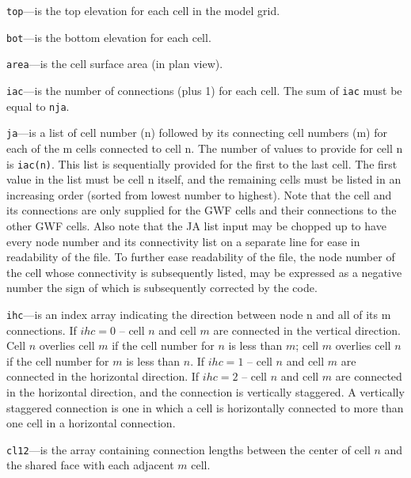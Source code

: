\item \texttt{top}---is the top elevation for each cell in the model grid.

\item \texttt{bot}---is the bottom elevation for each cell.

\item \texttt{area}---is the cell surface area (in plan view).

\item \texttt{iac}---is the number of connections (plus 1) for each cell.  The sum of \texttt{iac} must be equal to \texttt{nja}.

\item \texttt{ja}---is a list of cell number (n) followed by its connecting cell numbers (m) for each of the m cells connected to cell n. The number of values to provide for cell n is \texttt{iac(n)}.  This list is sequentially provided for the first to the last cell. The first value in the list must be cell n itself, and the remaining cells must be listed in an increasing order (sorted from lowest number to highest).  Note that the cell and its connections are only supplied for the GWF cells and their connections to the other GWF cells.  Also note that the JA list input may be chopped up to have every node number and its connectivity list on a separate line for ease in readability of the file. To further ease readability of the file, the node number of the cell whose connectivity is subsequently listed, may be expressed as a negative number the sign of which is subsequently corrected by the code.

\item \texttt{ihc}---is an index array indicating the direction between node n and all of its m connections.  If $ihc=0$ -- cell $n$ and cell $m$ are connected in the vertical direction.  Cell $n$ overlies cell $m$ if the cell number for $n$ is less than $m$; cell $m$ overlies cell $n$ if the cell number for $m$ is less than $n$.  If $ihc=1$ -- cell $n$ and cell $m$ are connected in the horizontal direction.  If $ihc=2$ -- cell $n$ and cell $m$ are connected in the horizontal direction, and the connection is vertically staggered.  A vertically staggered connection is one in which a cell is horizontally connected to more than one cell in a horizontal connection.

\item \texttt{cl12}---is the array containing connection lengths between the center of cell $n$ and the shared face with each adjacent $m$ cell.

